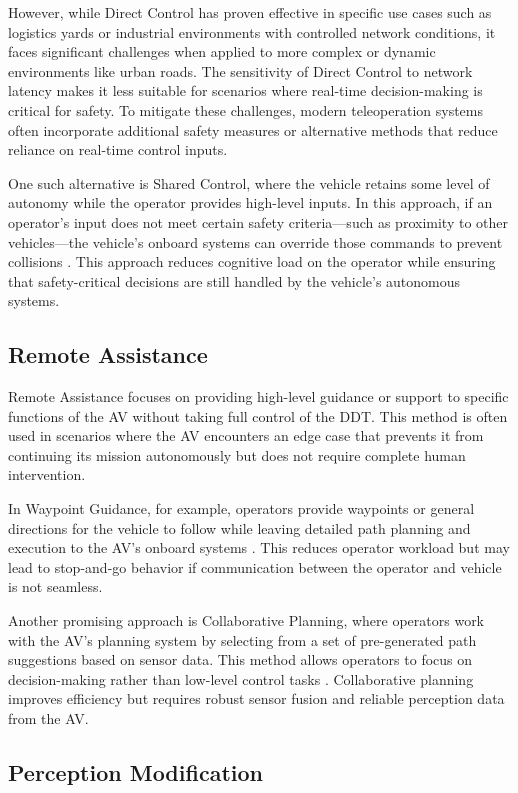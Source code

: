 However, while Direct Control has proven effective in specific use cases
such as logistics yards or industrial environments with
controlled network conditions, it faces significant challenges when
applied to more complex or dynamic environments like urban roads.
The sensitivity of Direct Control to network latency makes it less
suitable for scenarios where real-time decision-making is critical for
safety. To mitigate these challenges, modern teleoperation systems
often incorporate additional safety measures or alternative methods
that reduce reliance on real-time control inputs.

One such alternative is Shared Control, where the vehicle retains
some level of autonomy while the operator provides high-level
inputs. In this approach, if an operator's input does not meet
certain safety criteria—such as proximity to other vehicles—the
vehicle's onboard systems can override those commands to prevent
collisions \cite{kay2024sharedcontrol}. This approach reduces
cognitive load on the operator while ensuring that safety-critical
decisions are still handled by the vehicle's autonomous systems.

\subsection{Remote Assistance}
Remote Assistance focuses on providing high-level guidance or support
to specific functions of the AV without taking full control of the DDT.
This method is often used in scenarios where the AV encounters an
edge case that prevents it from continuing its mission autonomously
but does not require complete human intervention.

In Waypoint Guidance, for example, operators provide waypoints or general
directions for the vehicle to follow while leaving detailed path planning
and execution to the AV's onboard systems \cite{corridor}. This reduces
operator workload but may lead to stop-and-go behavior if communication
between the operator and vehicle is not seamless.

Another promising approach is Collaborative Planning, where operators
work with the AV's planning system by selecting from a set of pre-generated
path suggestions based on sensor data. This method allows operators to focus
on decision-making rather than low-level control tasks \cite{hosseini2024collaborative}.
Collaborative planning improves efficiency but requires robust sensor fusion and reliable
perception data from the AV.
\subsection{Perception Modification}

